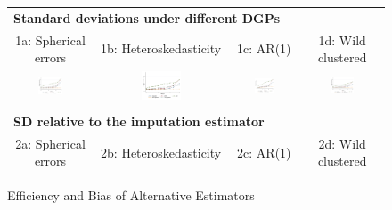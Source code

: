 \documentclass[english,11pt]{article}
\providecommand{\tabularnewline}{\\}
\theoremstyle{plain}
\theoremstyle{plain}
\theoremstyle{plain}
\theoremstyle{plain}
\begin{document}
\begin{landscape}

\begin{figure}
\caption{Efficiency and Bias of Alternative Estimators\label{fig:Monte-Carlo-Simulation}}
\medskip{}

\begin{centering}
\begin{tabular}{cccc}
\multicolumn{4}{l}{\textbf{\small{}Standard deviations under different DGPs}}\tabularnewline
{\small{}1a: Spherical errors} & {\small{}1b: Heteroskedasticity} & {\small{}1c: AR(1)} & {\small{}1d: Wild clustered}\tabularnewline
\includegraphics[width=0.32\textwidth]{Graphs/FigureA2_1_homo} & \includegraphics[width=0.32\textwidth]{Graphs/FigureA2_1_hetero} & \includegraphics[width=0.32\textwidth]{Graphs/FigureA2_1_ar1} & \includegraphics[width=0.32\textwidth]{Graphs/FigureA2_1_wild}\tabularnewline
 &  &  & \tabularnewline
\multicolumn{4}{l}{\textbf{\footnotesize{}SD relative to the imputation estimator}}\tabularnewline
{\footnotesize{}2a: Spherical errors} & {\footnotesize{}2b: Heteroskedasticity} & {\footnotesize{}2c: AR(1)} & {\footnotesize{}2d: Wild clustered}\tabularnewline

\end{tabular}
\end{centering}
\end{figure}
\end{landscape}
\end{document}
